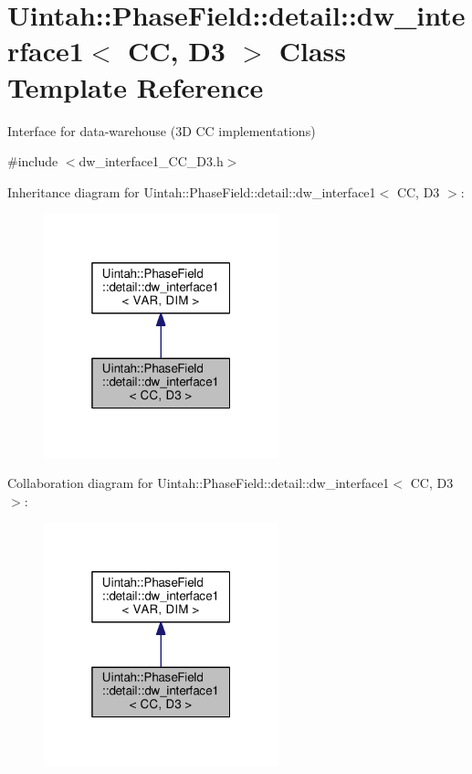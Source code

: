 \hypertarget{classUintah_1_1PhaseField_1_1detail_1_1dw__interface1_3_01CC_00_01D3_01_4}{}\section{Uintah\+:\+:Phase\+Field\+:\+:detail\+:\+:dw\+\_\+interface1$<$ CC, D3 $>$ Class Template Reference}
\label{classUintah_1_1PhaseField_1_1detail_1_1dw__interface1_3_01CC_00_01D3_01_4}


Interface for data-\/warehouse (3D CC implementations)  




{\ttfamily \#include $<$dw\+\_\+interface1\+\_\+\+C\+C\+\_\+\+D3.\+h$>$}



Inheritance diagram for Uintah\+:\+:Phase\+Field\+:\+:detail\+:\+:dw\+\_\+interface1$<$ CC, D3 $>$\+:\nopagebreak
\begin{figure}[H]
\begin{center}
\leavevmode
\includegraphics[width=193pt]{classUintah_1_1PhaseField_1_1detail_1_1dw__interface1_3_01CC_00_01D3_01_4__inherit__graph}
\end{center}
\end{figure}


Collaboration diagram for Uintah\+:\+:Phase\+Field\+:\+:detail\+:\+:dw\+\_\+interface1$<$ CC, D3 $>$\+:\nopagebreak
\begin{figure}[H]
\begin{center}
\leavevmode
\includegraphics[width=193pt]{classUintah_1_1PhaseField_1_1detail_1_1dw__interface1_3_01CC_00_01D3_01_4__coll__graph}
\end{center}
\end{figure}
